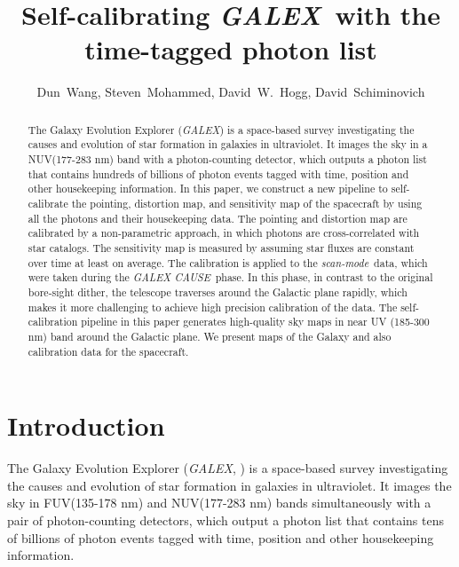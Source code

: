 \documentclass[12pt, preprint]{aastex}
\newcommand{\project}[1]{\textsl{#1}}
\newcommand{\galex}{\project{GALEX}}
\newcommand{\cause}{\project{GALEX CAUSE}}
\newcommand{\scanmode}{\project{scan-mode}}
\begin{document}
\title{Self-calibrating \galex\ with the time-tagged photon list}
\author{%
  Dun~Wang\altaffilmark{\ref{CCPP}},
  Steven~Mohammed\altaffilmark{\ref{CU}},
  David~W.~Hogg\altaffilmark{\ref{CCPP},\ref{CDS},\ref{MPIA},\ref{CCA}},
  David~Schiminovich\altaffilmark{\ref{CU}}
  }
\setcounter{address}{1}

\begin{abstract}
The Galaxy Evolution Explorer (\galex) is a space-based survey investigating the causes and evolution of star formation in galaxies in ultraviolet. 
It images the sky in a NUV(177-283 nm) band with a photon-counting detector, which outputs a photon list that contains hundreds of billions of photon events tagged with time, position and other housekeeping information.
In this paper, we construct a new pipeline to self-calibrate the pointing,  distortion map, and sensitivity map of the spacecraft by using all the photons and their housekeeping data.
The pointing and distortion map are calibrated by a non-parametric approach, in which photons are cross-correlated with star catalogs.
The sensitivity map is measured by assuming star fluxes are constant over time at least on average.
The calibration is applied to the \scanmode\ data, which were taken during the \cause\ phase.
In this phase, in contrast to the original bore-sight dither, the telescope traverses around the Galactic plane rapidly, which makes it more challenging to achieve high precision calibration of the data. 
The self-calibration pipeline in this paper generates high-quality sky maps in near UV (185-300 nm) band around the Galactic plane.
We present maps of the Galaxy and also calibration data for the spacecraft.

\end{abstract}

\section{Introduction}
The Galaxy Evolution Explorer (\galex, \cite{galex1}) is a space-based survey investigating the causes and evolution of star formation in galaxies in ultraviolet. 
It images the sky in FUV(135-178 nm) and NUV(177-283 nm) bands simultaneously with a pair of photon-counting detectors, which output a photon list that contains tens of billions of photon events tagged with time, position and other housekeeping information.
\end{document}
